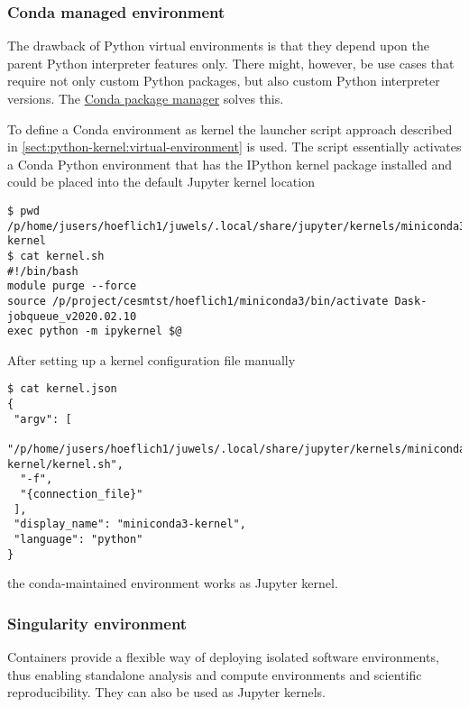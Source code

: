 \documentclass[11pt,a4paper]{article}
\begin{document}
\subsubsection{Conda managed environment}
\label{sect:conda-environment}

The drawback of Python virtual environments is that they depend upon the parent Python interpreter features only.
There might, however, be use cases that require not only custom Python packages, but also custom Python interpreter versions.
The \href{https://conda.io/en/latest/}{Conda package manager} solves this.

To define a Conda environment as kernel the launcher script approach described in \ref{sect:python-kernel:virtual-environment} is used.
The script essentially activates a Conda Python environment that has the IPython kernel package installed and could be placed into the default Jupyter kernel location

\begin{verbatim}
$ pwd
/p/home/jusers/hoeflich1/juwels/.local/share/jupyter/kernels/miniconda3-kernel
$ cat kernel.sh
#!/bin/bash
module purge --force
source /p/project/cesmtst/hoeflich1/miniconda3/bin/activate Dask-jobqueue_v2020.02.10
exec python -m ipykernel $@
\end{verbatim}

After setting up a kernel configuration file manually

\begin{verbatim}
$ cat kernel.json
{
 "argv": [
  "/p/home/jusers/hoeflich1/juwels/.local/share/jupyter/kernels/miniconda3-kernel/kernel.sh",
  "-f",
  "{connection_file}"
 ],
 "display_name": "miniconda3-kernel",
 "language": "python"
}
\end{verbatim}

the conda-maintained environment works as Jupyter kernel.


\subsubsection{Singularity environment}
\label{sect:container-based-environment}

Containers provide a flexible way of deploying isolated software environments, thus enabling standalone analysis and compute environments and scientific reproducibility. They can also be used as Jupyter kernels.
\end{document}
